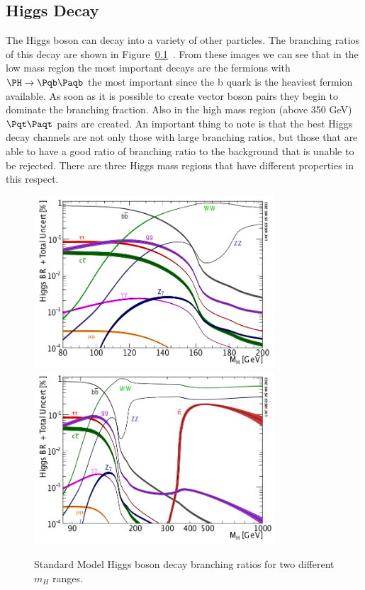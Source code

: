 \subsection{Higgs Decay}

The Higgs boson can decay into a variety of other particles.  The branching ratios of this decay are shown in Figure~\ref{}~\cite{LHC_Higgs_Gallery}.  From these images we can see that in the low mass region the most important decays are the fermions with $\PH \rightarrow \Pqb\Paqb$ the most important since the b quark is the heaviest fermion available.  As soon as it is possible to create vector boson pairs they begin to dominate the branching fraction.  Also in the high mass region (above 350 GeV) $\Pqt\Paqt$ pairs are created.  An important thing to note is that the best Higgs decay channels are not only those with large branching ratios, but those that are able to have a good ratio of branching ratio to the background that is unable to be rejected.  There are three Higgs mass regions that have different properties in this respect.


\begin{figure}[htb]
\centering
\includegraphics[width=0.8\textwidth]{StandardModel/Higgs_BR_LM_RECT.png} \includegraphics[width=0.8\textwidth]{StandardModel/Higgs_BR_RECT.png}
\caption{\small Standard Model Higgs boson decay branching ratios for two different $m_H$ ranges. ~\cite{LHC_Higgs_Gallery}
         }
\label{fig:Higgs_decay}
\end{figure}



